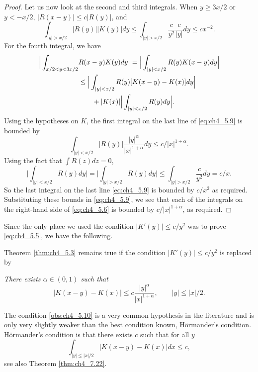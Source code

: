 \begin{proof}
Let us now look at the second and third integrals. When $y \geq 3x/2$ or $y < -x/2$, $|R(x-y)| \leq c|R(y)|$, and
\begin{equation}\label{eq:ch4_5.8}
    \int_{|y|>x/2} |R(y)||K(y)|dy \leq \int_{|y|>x/2} \frac{c}{y^2}\frac{c}{|y|}dy \leq cx^{-2}.
\end{equation}
For the fourth integral, we have
\begin{align}\label{eq:ch4_5.9}
    \Big|\int_{x/2<y<3x/2} &R(x-y)K(y)dy\Big| = \Big|\int_{|y|<x/2} R(y)K(x-y)dy\Big| \\
    &\leq \Big|\int_{|y|<x/2} R(y)[K(x-y) - K(x)]dy\Big| \notag \\
    &\qquad+ |K(x)|\Big|\int_{|y|<x/2} R(y)dy\Big|. \notag
\end{align}
\mnewpage
Using the hypotheses on $K$, the first integral on the last line of \eqref{eq:ch4_5.9} is bounded by
\[
    \int_{|y|<x/2} |R(y)| \frac{|y|^\alpha}{|x|^{1+\alpha}}dy \leq c/|x|^{1+\alpha}.
\]
Using the fact that $\int R(z)dz=0$,
\[
    \Big|\int_{|y|<x/2} R(y)dy\Big|=\Big|\int_{|y|>x/2} R(y)dy\Big| \le \int_{|y|>x/2}\frac{c}{y^2}dy=c/x.
\]
So the last integral on the last line \eqref{eq:ch4_5.9} is bounded by $c/x^2$ as required. Substituting these bounds in \eqref{eq:ch4_5.9}, we see that each of the integrals on the right-hand side of \eqref{eq:ch4_5.6} is bounded by $c/|x|^{1+\alpha}$, as required.
\end{proof}

Since the only place we used the condition $|K'(y)| \leq c/y^2$ was to prove \eqref{eq:ch4_5.5}, we have the following.

\begin{corollary}\label{cor:ch4_5.4}
Theorem \ref{thm:ch4_5.3} remains true if the condition $|K'(y)| \leq c/y^2$ is replaced by
\vspace{-1\baselineskip}
\begin{obs}\label{obs:ch4_5.10}
    \textit{There exists $\alpha \in (0,1)$ such that}
    \[
        |K(x-y) - K(x)| \leq c\frac{|y|^\alpha}{|x|^{1+\alpha}}, \qquad |y| \leq |x|/2.
    \]
\end{obs}
\end{corollary}

The condition \eqref{obs:ch4_5.10} is a very common hypothesis in the literature and is only very slightly weaker than the best condition known, H\"ormander's condition. H\"ormander's condition is that there exists $c$ such that for all $y$
\begin{equation}\label{eq:ch4_5.11}
\int_{|y|\leq |x|/2} |K(x-y) - K(x)|dx \leq c,
\end{equation}
see also Theorem \ref{thm:ch4_7.22}.


